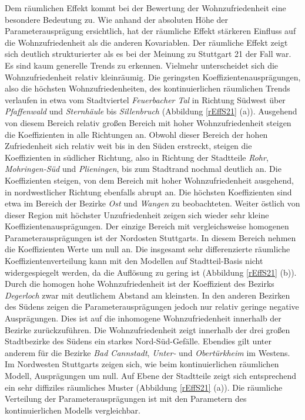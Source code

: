 \documentclass{Vorlage}
\begin{document}
Dem räumlichen Effekt kommt bei der Bewertung der Wohnzufriedenheit eine besondere Bedeutung zu. Wie anhand der absoluten Höhe der Parameterausprägung ersichtlich, hat der räumliche Effekt stärkeren Einfluss auf die Wohnzufriedenheit als die anderen Kovariablen. Der räumliche Effekt zeigt sich deutlich strukturierter als es bei der Meinung zu Stuttgart 21 der Fall war. Es sind kaum generelle Trends zu erkennen. Vielmehr unterscheidet sich die Wohnzufriedenheit relativ kleinräumig. Die geringsten Koeffizientenausprägungen, also die höchsten Wohnzufriedenheiten, des kontinuierlichen räumlichen Trends verlaufen in etwa vom Stadtviertel \textit{Feuerbacher Tal} in Richtung Südwest über \textit{Pfaffenwald} und \textit{Sternhäule} bis \textit{Sillenbruch} (Abbildung \ref{rEffS21} (a)). Ausgehend von diesem Bereich relativ großen Bereich mit hoher Wohnzufriedenheit steigen die Koeffizienten in alle Richtungen an. Obwohl dieser Bereich der hohen Zufriedenheit sich relativ weit bis in den Süden erstreckt, steigen die Koeffizienten in südlicher Richtung, also in Richtung der Stadtteile \textit{Rohr}, \textit{Mohringen-Süd} und \textit{Plieningen}, bis zum Stadtrand nochmal deutlich an. Die Koeffizienten steigen, von dem Bereich mit hoher Wohnzufriedenheit ausgehend, in nordwestlicher Richtung ebenfalls abrupt an. Die höchsten  Koeffizienten sind etwa im Bereich der Bezirke \textit{Ost} und \textit{Wangen} zu beobachteten. Weiter östlich von dieser Region mit höchster Unzufriedenheit zeigen sich wieder sehr kleine Koeffizientenausprägungen. Der einzige Bereich mit vergleichsweise homogenen Parameterausprägungen ist der Nordosten Stuttgarts. In diesem Bereich nehmen die Koeffizienten Werte um null an. Die insgesamt sehr differenzierte räumliche Koeffizientenverteilung kann mit den Modellen auf Stadtteil-Basis nicht widergespiegelt werden, da die Auflösung zu gering ist (Abbildung \ref{rEffS21} (b)). Durch die homogen hohe Wohnzufriedenheit ist der Koeffizient des Bezirks \textit{Degerloch} zwar mit deutlichem Abstand am kleinsten. In den anderen Bezirken des Südens zeigen die Parameterausprägungen jedoch nur relativ geringe negative Ausprägungen. Dies ist auf die inhomogene Wohnzufriedenheit innerhalb der Bezirke zurückzuführen. Die Wohnzufriedenheit zeigt innerhalb der drei großen Stadtbezirke des Südens ein starkes Nord-Süd-Gefälle. Ebendies gilt unter anderem für die Bezirke \textit{Bad Cannstadt}, \textit{Unter-} und \textit{Obertürkheim} im Westens. Im Nordwesten Stuttgarts zeigen sich, wie beim kontinuierlichen räumlichen Modell, Ausprägungen um null. Auf Ebene der Stadtteile zeigt sich entsprechend ein sehr diffiziles räumliches Muster (Abbildung \ref{rEffS21} (a)). Die räumliche Verteilung der Parameterausprägungen ist mit den Parametern des kontinuierlichen Modells vergleichbar.
\end{document}
